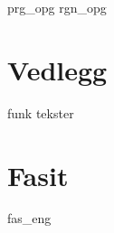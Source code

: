 {prg_opg}
{rgn_opg}	


\chapter*{Vedlegg} 
\newpage
{}
{funk}
{tekster}

\chapter*{Fasit}
{fas_eng}







